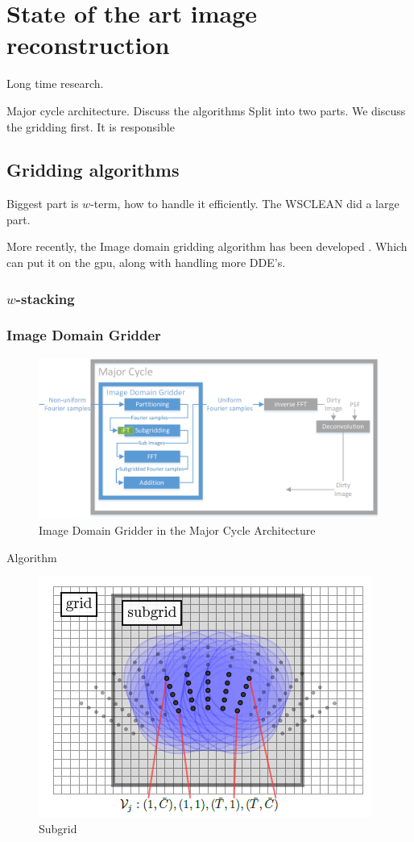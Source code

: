 \section{State of the art image reconstruction}
Long time research.

Major cycle architecture.
Discuss the algorithms 
Split into two parts. We discuss the gridding first. It is responsible

\subsection{Gridding algorithms}
Biggest part is $w$-term, how to handle it efficiently. The WSCLEAN \cite{offringa2014wsclean} did a large part.

More recently, the Image domain gridding algorithm has been developed \cite{veenboer2017image}. Which can put it on the gpu, along with handling more DDE's.

\subsubsection{$w$-stacking}

\subsubsection{Image Domain Gridder}
\begin{figure}[h]
	\centering
	\includegraphics[width=0.80\linewidth]{./chapters/03.distribution/idg/major-minor-idg.png}
	\caption{Image Domain Gridder in the Major Cycle Architecture}
	\label{distribution:idg:system}
\end{figure}

Algorithm
\begin{figure}[h]
	\centering
	\includegraphics[width=0.40\linewidth]{./chapters/03.distribution/idg/subgrid.png}
	\caption{Subgrid}
	\label{distribution:idg:subgrid}
\end{figure}


